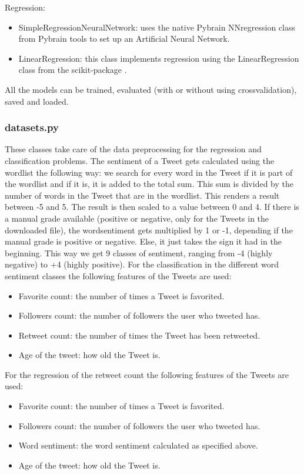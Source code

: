 \documentclass[10pt]{IEEEtran}
\begin{document}
Regression:
\begin{itemize}
	\item SimpleRegressionNeuralNetwork: uses the native Pybrain NNregression class from Pybrain tools to set up an Artificial Neural Network. 
	\item LinearRegression: this class implements regression using the LinearRegression class from the scikit-package \cite{sklearn}.
\end{itemize}

All the models can be trained, evaluated (with or without using crossvalidation), saved and loaded.

\subsubsection{datasets.py}
\label{sec:datasets}

These classes take care of the data preprocessing for the regression and classification problems. 
The sentiment of a Tweet gets calculated using the wordlist the following way: we search for every word in the Tweet if it is part of the wordlist and if it is, it is added to the total sum. This sum is divided by the number of words in the Tweet that are in the wordlist. This renders a result between -5 and 5. The result is then scaled to a value between 0 and 4. If there is a manual grade available (positive or negative, only for the Tweets in the downloaded file), the wordsentiment gets multiplied by 1 or -1, depending if the manual grade is positive or negative. Else, it just takes the sign it had in the beginning. This way we get 9 classes of sentiment, ranging from -4 (highly negative) to +4 (highly positive). 
For the classification in the different word sentiment classes the following features of the Tweets are used:
\begin{itemize}
	\item Favorite count: the number of times a Tweet is favorited.
	\item Followers count: the number of followers the user who tweeted has.
	\item Retweet count: the number of times the Tweet has been retweeted.
	\item Age of the tweet: how old the Tweet is.
\end{itemize}

For the regression of the retweet count the following features of the Tweets are used:
\begin{itemize}
	\item Favorite count: the number of times a Tweet is favorited.
	\item Followers count: the number of followers the user who tweeted has.
	\item Word sentiment: the word sentiment calculated as specified above.
	\item Age of the tweet: how old the Tweet is.
\end{itemize}
\end{document}
